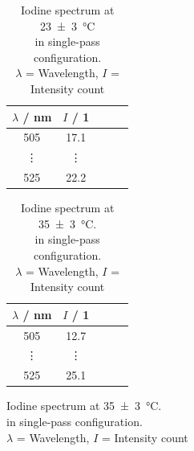 \begin{figure}[H]
    \centering
    \begin{minipage}[b]{0.48\textwidth}
        \centering
        \begin{table}[H]
            \centering
            \caption{Iodine spectrum at \SI{23(3)}{\celsius} \\in single-pass configuration. \\
            $\lambda$ = Wavelength, $I$ = Intensity count}
            \label{tab:execution:iodine:single:1}
            \begin{tabular}{ccccc}
            \hline
            $\lambda$ / nm & $I$ / 1 \\ \hline
            505  & 17.1  \\
            \vdots & \vdots  \\
            525 & 22.2 \\ \hline
            \end{tabular}
        \end{table}
    \end{minipage}
    \hfill
     \begin{minipage}[b]{0.48\textwidth}
        \centering
        \begin{table}[H]
            \centering
            \caption{Iodine spectrum at \SI{35(3)}{\celsius}. \\in single-pass configuration. \\
            $\lambda$ = Wavelength, $I$ = Intensity count}
            \label{tab:execution:iodine:single:2}
            \begin{tabular}{ccccc}
            \hline
            $\lambda$ / nm & $I$ / 1 \\ \hline
            505  & 12.7  \\
            \vdots & \vdots  \\
            525 & 25.1 \\ \hline
            \end{tabular}
        \end{table}
    \end{minipage}
\end{figure}

